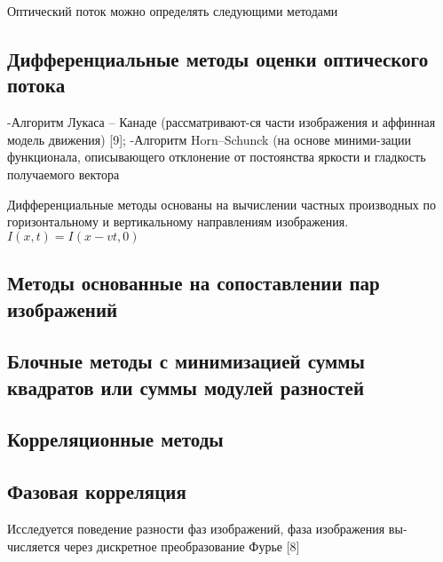 Оптический поток можно определять следующими методами
\subsection{Дифференциальные методы оценки оптического потока} 
-Алгоритм Лукаса – Канаде (рассматривают-ся части изображения и аффинная модель движения) [9];
-Алгоритм Horn–Schunck (на основе миними-зации функционала, описывающего  отклонение от постоянства яркости и гладкость получаемого вектора

Дифференциальные методы основаны на вычислении частных производных по горизонтальному и вертикальному направлениям изображения. 
$I(x,t) = I ( x - vt, 0)$
\subsection{Методы основанные на сопоставлении пар изображений}
\subsection{Блочные  методы  с  минимизацией  суммы квадратов или суммы модулей разностей}
\subsection{Корреляционные методы}
\subsection{Фазовая корреляция} 
Исследуется поведение разности фаз изображений, фаза изображения  вы-числяется через дискретное преобразование Фурье [8]
